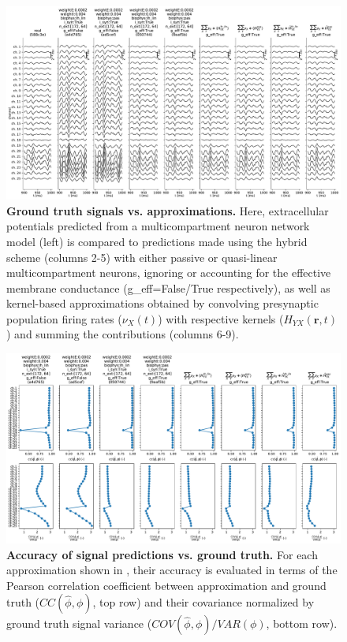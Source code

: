 \begin{figure}[!ht]
\begin{center}
\includegraphics[width=\textwidth]{Figures/Ch-LFPy/Ch-LFPy-signal_vs_predictions.pdf}
\end{center}
\caption{\textbf{Ground truth signals vs. approximations.}
Here, extracellular potentials predicted from a multicompartment neuron network model (left) is compared to predictions made using the hybrid scheme (columns 2-5)
with either passive or quasi-linear multicompartment neurons,
ignoring or accounting for the effective membrane conductance (g\_eff=False/True respectively),
as well as kernel-based approximations obtained by convolving presynaptic population firing rates ($\nu_X(t)$) with respective kernels ($H_{YX}(\mathbf{r}, t)$) and summing the contributions (columns 6-9).
}
\label{fig:LFPy_predictions}
\end{figure}


\begin{figure}[!ht]
\begin{center}
\includegraphics[width=\textwidth]{Figures/Ch-LFPy/Ch-LFPy-correlations.pdf}
\end{center}
\caption{\textbf{Accuracy of signal predictions vs. ground truth.}
For each approximation shown in ,
their accuracy is evaluated in terms of the Pearson correlation coefficient between approximation and ground truth ($CC(\hat{\phi}, \phi)$, top row) and
their covariance normalized by ground truth signal variance ($COV(\hat{\phi}, \phi)/VAR(\phi)$, bottom row).
}
\label{fig:LFPy_correlations}
\end{figure}



